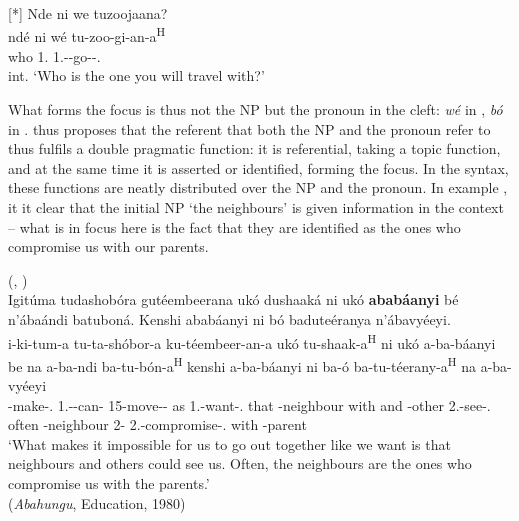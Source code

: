 \documentclass[output=paper]{langscibook}
\begin{document}
\ea
[*]{
\label{bkm:Ref79142314}
Nde ni we tuzoojaana?\\
\gll
ndé  ni  wé  tu-zoo-gi-an-a\textsuperscript{H}\\
who  \COP{}  1.\PRO{}  1\PL.\SM-\FUT{}-go-\ASS-\FV.\REL{}\\
\glt
int. ‘Who is the one you will travel with?’\\
}

\z

What forms the focus is thus not the NP but the pronoun in the cleft: \textit{wé} in , \textit{bó} in . \citet{Nshemezimana2016} thus proposes that the referent that both the NP and the pronoun refer to thus fulfils a double pragmatic function: it is referential, taking a topic function, and at the same time it is asserted or identified, forming the focus. In the syntax, these functions are neatly distributed over the NP and the pronoun. In example , it it clear that the initial NP ‘the neighbours’ is given information in the context – what is in focus here is the fact that they are identified as the ones who compromise us with our parents.
\pagebreak

\ea
\label{bkm:Ref81411744}
(\citealt[248]{Nshemezimana2016}, \citealt[94]{LafkiouiEtAl2016})\\
Igitúma tudashobóra gutéembeerana ukó dushaaká ni ukó \textbf{ababáanyi} bé n’ábaándi batuboná. Kenshi ababáanyi ni bó baduteéranya n’ábavyéeyi.\\
\gll
i-ki-tum-a  tu-ta-shóbor-a  ku-téembeer-an-a  ukó tu-shaak-a\textsuperscript{H}\textsuperscript{} ni  ukó  a-ba-báanyi  be  na  a-ba-ndi ba-tu-bón-a\textsuperscript{H}  kenshi  a-ba-báanyi  ni  ba-ó  ba-tu-téerany-a\textsuperscript{H}  na  a-ba-vyéeyi\\
-{}make-\FV.\REL{}  1\PL.\SM-\NEG{}-can-\FV{}  15-move-\ASS-\FV{}  as  1\PL.\SM{}-want-\FV.\REL{}  \COP{}  that  -{}neighbour  with  and  -other  2\PL.\OM{}-see-\FV.\REL{}  often  -neighbour  \COP{}  2-\PRO{}  2\PL.\OM{}-compromise-\FV.\REL{}  with  -parent\\
\glt
‘What makes it impossible for us to go out together like we want is that neighbours and others could see us. Often, the neighbours are the ones who compromise us with the parents.’\\
(\textit{Abahungu}, Education, 1980)
\end{document}
